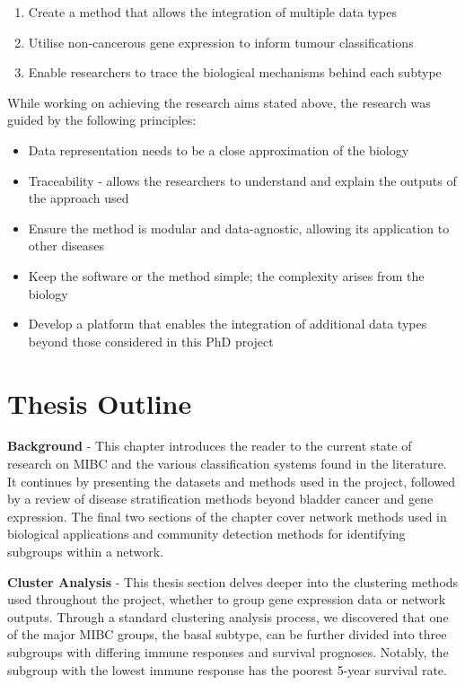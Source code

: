 \begin{enumerate}
    \item Create a method that allows the integration of multiple data types
    \item Utilise non-cancerous gene expression to inform tumour classifications
    \item Enable researchers to trace the biological mechanisms behind each subtype
\end{enumerate}

While working on achieving the research aims stated above, the research was guided by the following principles:

\begin{itemize}
    \item Data representation needs to be a close approximation of the biology
    \item Traceability - allows the researchers to understand and explain the outputs of the approach used
    \item Ensure the method is modular and data-agnostic, allowing its application to other diseases
    \item Keep the software or the method simple; the complexity arises from the biology
    \item Develop a platform that enables the integration of additional data types beyond those considered in this PhD project
\end{itemize}

\section{Thesis Outline}

\textbf{Background} - This chapter introduces the reader to the current state of research on MIBC and the various classification systems found in the literature. It continues by presenting the datasets and methods used in the project, followed by a review of disease stratification methods beyond bladder cancer and gene expression. The final two sections of the chapter cover network methods used in biological applications and community detection methods for identifying subgroups within a network.


\textbf{Cluster Analysis} - This thesis section delves deeper into the clustering methods used throughout the project, whether to group gene expression data or network outputs. Through a standard clustering analysis process, we discovered that one of the major MIBC groups, the basal subtype, can be further divided into three subgroups with differing immune responses and survival prognoses. Notably, the subgroup with the lowest immune response has the poorest 5-year survival rate.

